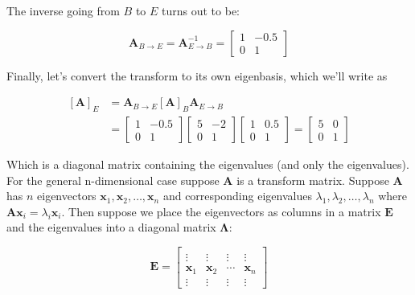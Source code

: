 \documentclass[main.tex]{subfiles}
\begin{document}
    The inverse going from $B$ to $E$ turns out to be: 
    
    $$
    \mathbf{A}_{B \rightarrow E}=\mathbf{A}_{E \rightarrow B}^{-1}=\left[\begin{array}{cc}
    1 & -0.5 \\
    0 & 1
    \end{array}\right]
    $$
    
    Finally, let's convert the transform to its own eigenbasis, which we'll write as
    
    $$
    \begin{aligned}
    [\mathbf{A}]_{E} &=\mathbf{A}_{B \rightarrow E}[\mathbf{A}]_{B} \mathbf{A}_{E \rightarrow B} \\
    &=\left[\begin{array}{cc}
    1 & -0.5 \\
    0 & 1
    \end{array}\right]\left[\begin{array}{cc}
    5 & -2 \\
    0 & 1
    \end{array}\right]\left[\begin{array}{cc}
    1 & 0.5 \\
    0 & 1
    \end{array}\right]=\left[\begin{array}{ll}
    5 & 0 \\
    0 & 1
    \end{array}\right]
    \end{aligned}
    $$
    
    Which is a diagonal matrix containing the eigenvalues (and only the eigenvalues). For the general n-dimensional case suppose $\mathbf{A}$ is a transform matrix. Suppose $\mathbf{A}$ has $n$ eigenvectors $\mathbf{x}_{1}, \mathbf{x}_{2}, \ldots, \mathbf{x}_{n}$ and corresponding eigenvalues $\lambda_{1}, \lambda_{2}, \ldots, \lambda_{n}$ where $\mathbf{A x}_{i}=\lambda_{i} \mathbf{x}_{i}$. Then suppose we place the eigenvectors as columns in a matrix $\mathbf{E}$ and the eigenvalues into a diagonal matrix $\mathbf{\Lambda}$:
    
    $$
    \mathbf{E}=\left[\begin{array}{cccc} 
    & & & \\
    \vdots & \vdots & \vdots & \vdots \\
    \mathbf{x}_{1} & \mathbf{x}_{2} & \cdots & \mathbf{x}_{n} \\
    \vdots & \vdots & \vdots & \vdots
    \end{array}\right]
    $$
    
\end{document}
